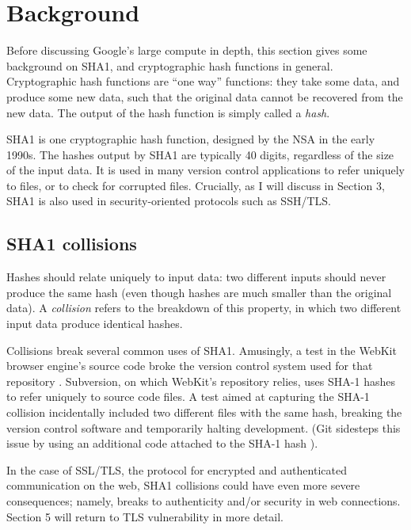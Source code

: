 \documentclass[sigconf]{acmart}
\begin{document}
\section{Background}
\label{sec:org8250138}


Before discussing Google's large compute in depth,
this section gives some background on SHA1, and cryptographic hash functions in general.
Cryptographic hash functions are ``one way'' functions: 
they take some data, and produce some new data, such that the original data cannot be recovered from the new data. The output of the hash function is simply called a \emph{hash}.

SHA1 is one cryptographic hash function, designed by the NSA in the early 1990s.
The hashes output by SHA1 are typically 40 digits, regardless of the size of the input data.
It is used in many version control applications to refer uniquely to files, 
or to check for corrupted files. 
Crucially, as I will discuss in Section 3, SHA1 is also used in security-oriented protocols such as SSH/TLS.


\subsection{SHA1 collisions}
\label{sec:org4e33e29}

Hashes should relate uniquely to input data: 
two different inputs should never produce the same hash (even though hashes are much smaller than the original data).
A \emph{collision} refers to the breakdown of this property,
in which two different input data produce identical hashes.

Collisions break several common uses of SHA1. 
Amusingly, a test in the WebKit browser engine's source code
broke the version control system used for that repository \cite{Koivisto2017}.
Subversion, on which WebKit's repository relies, uses SHA-1 hashes to refer uniquely to source code files.
A test aimed at capturing the SHA-1 collision incidentally included two different files with the same hash, 
breaking the version control software and temporarily halting development.
(Git sidesteps this issue by using an additional code  attached to the SHA-1 hash \cite{Torvalds2017}).

In the case of SSL/TLS, the protocol for encrypted and authenticated communication on the web, SHA1 collisions could have even more severe consequences;
namely, breaks to authenticity and/or security in web connections.
Section 5 will return to TLS vulnerability in more detail.
\end{document}
